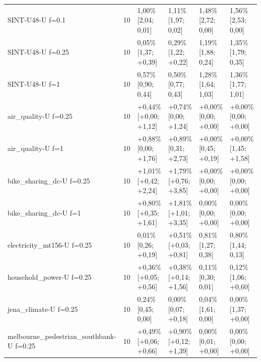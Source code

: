 \begin{table}[htbp]
\begin{tabular}{lrllll}
SINT-U48-U f=0.1 & 10 & \textminus{}1,00\% [\textminus{}2,04; \textminus{}0,01] & \textminus{}1,11\% [\textminus{}1,97; \textminus{}0,02] & \textminus{}1,48\% [\textminus{}2,72; \textminus{}0,00] & \textminus{}1,56\% [\textminus{}2,53; \textminus{}0,00] \\
SINT-U48-U f=0.25 & 10 & \textminus{}0,05\% [\textminus{}1,37; +0,39] & \textminus{}0,29\% [\textminus{}1,22; +0,22] & \textminus{}1,19\% [\textminus{}1,88; \textminus{}0,24] & \textminus{}1,35\% [\textminus{}1,79; \textminus{}0,35] \\
SINT-U48-U f=1 & 10 & \textminus{}0,57\% [\textminus{}0,90; \textminus{}0,44] & \textminus{}0,50\% [\textminus{}0,77; \textminus{}0,43] & \textminus{}1,28\% [\textminus{}1,64; \textminus{}1,03] & \textminus{}1,36\% [\textminus{}1,77; \textminus{}1,01] \\
air\_quality-U f=0.25 & 10 & +0,44\% [+0,00; +1,12] & +0,74\% [\textminus{}0,00; +1,24] & +0,00\% [\textminus{}0,00; +0,00] & +0,00\% [\textminus{}0,00; +0,00] \\
air\_quality-U f=1 & 10 & +0,88\% [\textminus{}0,00; +1,76] & +0,89\% [\textminus{}0,31; +2,73] & +0,00\% [\textminus{}0,45; +0,19] & +0,00\% [\textminus{}1,45; +1,58] \\
bike\_sharing\_dc-U f=0.25 & 10 & +1,01\% [+0,42; +2,24] & +1,79\% [+0,76; +3,85] & +0,00\% [\textminus{}0,00; +0,00] & +0,00\% [\textminus{}0,00; +0,00] \\
bike\_sharing\_dc-U f=1 & 10 & +0,80\% [+0,35; +1,61] & +1,81\% [+1,01; +3,35] & \textminus{}0,00\% [\textminus{}0,00; +0,00] & \textminus{}0,00\% [\textminus{}0,00; +0,00] \\
electricity\_mt156-U f=0.25 & 10 & \textminus{}0,01\% [\textminus{}0,26; +0,19] & +0,51\% [+0,03; +0,81] & \textminus{}0,81\% [\textminus{}1,27; \textminus{}0,38] & \textminus{}0,80\% [\textminus{}1,44; \textminus{}0,13] \\
household\_power-U f=0.25 & 10 & +0,36\% [+0,05; +0,56] & +0,38\% [+0,14; +1,56] & \textminus{}0,11\% [\textminus{}0,30; \textminus{}0,01] & \textminus{}0,12\% [\textminus{}1,06; +0,60] \\
jena\_climate-U f=0.25 & 10 & \textminus{}0,24\% [\textminus{}0,45; \textminus{}0,00] & \textminus{}0,00\% [\textminus{}0,07; +0,18] & \textminus{}0,04\% [\textminus{}1,61; \textminus{}0,00] & \textminus{}0,00\% [\textminus{}1,37; +0,00] \\
melbourne\_pedestrian\_southbank-U f=0.25 & 10 & +0,49\% [+0,06; +0,66] & +0,90\% [+0,12; +1,39] & \textminus{}0,00\% [\textminus{}0,01; +0,00] & \textminus{}0,00\% [\textminus{}0,00; +0,00] \\

\end{tabular}
\end{table}
